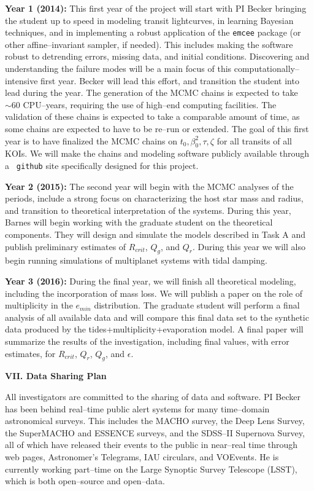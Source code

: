 {\bf Year 1 (2014):} This first year of the project will start with PI
Becker bringing the student up to speed in modeling transit
lightcurves, in learning Bayesian techniques, and in implementing a
robust application of the {\tt emcee} package (or other
affine--invariant sampler, if needed).  This includes making the
software robust to detrending errors, missing data, and initial
conditions.  Discovering and understanding the failure modes will be a
main focus of this computationally--intensive first year.  Becker will
lead this effort, and transition the student into lead during the
year.  The generation of the MCMC chains is expected to take $\sim 60$
CPU--years, requiring the use of high--end computing facilities. The
validation of these chains is expected to take a comparable amount of
time, as some chains are expected to have to be re--run or extended.
The goal of this first year is to have finalized the MCMC chains on
$t_0, \beta_0^2, \tau, \zeta$ for all transits of all KOIs.  We will
make the chains and modeling software publicly available through a {\tt
github} site specifically designed for this project.

{\bf Year 2 (2015):} The second year will begin with the MCMC analyses
of the periods, include a strong focus on characterizing the host star
mass and radius, and transition to theoretical interpretation of the
systems.  During this year, Barnes will begin working with the
graduate student on the theoretical components. They will design and
simulate the models described in Task A and publish preliminary
estimates of $R_{crit}$, $Q_g$, and $Q_r$. During this year we will
also begin running simulations of multiplanet systems with tidal
damping.

{\bf Year 3 (2016):} During the final year, we will finish all
theoretical modeling, including the incorporation of mass loss.  We
will publish a paper on the role of multiplicity in the $e_{min}$
distribution. The graduate student will perform a final analysis of
all available \kepler data and will compare this final data set to the
synthetic data produced by the tides+multiplicity+evaporation model.
A final paper will summarize the results of the investigation,
including final values, with error estimates, for $R_{crit}$, $Q_r$,
$Q_g$, and $\epsilon$.  


\bigskip
\centerline{\bf VII. Data Sharing Plan}
\smallskip

All investigators are committed to the sharing of data and software.
PI Becker has been behind real--time public alert systems for many
time--domain astronomical surveys.  This includes the MACHO survey,
the Deep Lens Survey, the SuperMACHO and ESSENCE surveys, and the
SDSS--II Supernova Survey, all of which have released their events to
the public in near--real time through web pages, Astronomer's
Telegrams, IAU circulars, and VOEvents.  He is currently
working part--time on the Large Synoptic Survey Telescope (LSST),
which is both open--source and open--data.

